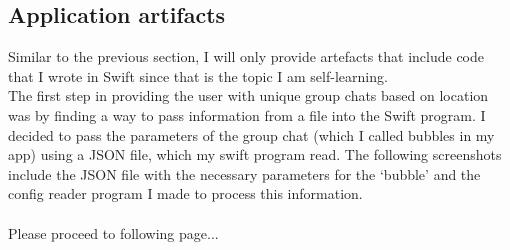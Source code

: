 \documentclass[a4paper, 11pt]{report}
\begin{document}
\subsection{Application artifacts}

Similar to the previous section, I will only provide artefacts that include code that I wrote in Swift since that is the topic I am self-learning.\\
The first step in providing the user with unique group chats based on location was by finding a way to pass information from a file into the Swift program. I decided to pass the parameters of the group chat (which I called bubbles in my app) using a JSON file, which my swift program read. The following screenshots include the JSON file with the necessary parameters for the ‘bubble’ and the config reader program I made to process this information.\\
\\
Please proceed to following page...
\end{document}

